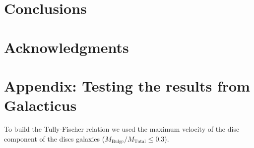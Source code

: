 \documentclass[usenatbib]{mn2e}
\begin{document}
\section{Conclusions}
\label{sec:conclusions}

\section*{Acknowledgments}  


 





\section{Appendix: Testing the results from Galacticus}
\label{sec:calibration}

To build the Tully-Fischer relation we used the maximum velocity of
the disc component of the discs galaxies
($M_{\text{Bulge}}/M_{\text{Total}}\le 0.3$).  
\end{document}

